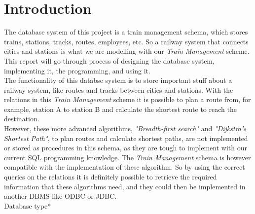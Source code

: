 \section{Introduction}

The database system of this project is a train management schema, which stores trains, stations, tracks, routes, employees, etc. So a railway system that connects cities and stations is what we are modelling with our \emph{Train Management} scheme.\\
This report will go through process of designing the database system, implementing it, the programming, and using it.\\[12pt]
The functionality of this databse system is to store important stuff about a railway system, like routes and tracks between cities and stations. With the relations in this \emph{Train Management} scheme it is possible to plan a route from, for example, station A to station B and calculate the shortest route to reach the destination.\\ However, these more advanced algorithms, \textit{"Breadth-first search"} and \textit{"Dijkstra's Shortest Path"}, to plan routes and calculate shortest paths, are not implemented or stored as procedures in this schema, as they are tough to implement with our current SQL programming knowledge.
The \emph{Train Management} schema is however compatible with the implementation of these algorithm. So by using the correct queries on the relations it is definitely possible to retrieve the required information that these algorithms need, and they could then be implemented in another DBMS like ODBC or JDBC.\\[12pt]
Database type*

